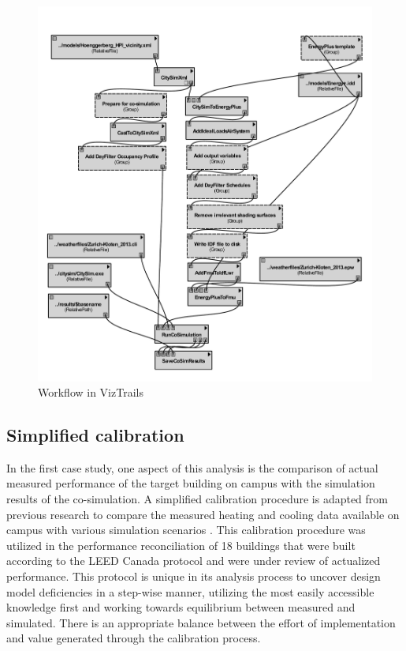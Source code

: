 \documentclass{tBPS2e}
\theoremstyle{plain}
\theoremstyle{definition}
\theoremstyle{remark}
\begin{document}
\begin{figure}[H]
  \centering
  \includegraphics[width=1.0\textwidth]{figures/36-cosim-HPI}
  \caption{Workflow in VizTrails
  \label{VizTrails}}
\end{figure}

\subsection{Simplified calibration}
In the first case study, one aspect of this analysis is the comparison of
actual measured performance of the target building on campus with the
simulation results of the co-simulation. A simplified calibration procedure is
adapted from previous research to compare the measured heating and cooling
data available on campus with various simulation scenarios
\citep{Samuelson:2015jg}. This calibration procedure was utilized in the
performance reconciliation of 18 buildings that were built according to the
LEED Canada protocol and were under review of actualized performance. This
protocol is unique in its analysis process to uncover design model
deficiencies in a step-wise manner, utilizing the most easily accessible
knowledge first and working towards equilibrium between measured and
simulated. There is an appropriate balance between the effort of implementation and value
generated through the calibration process.
\end{document}
